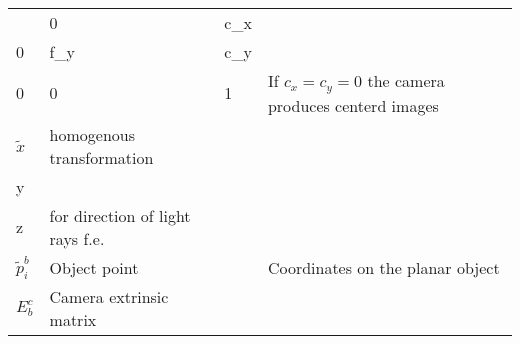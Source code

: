 \documentclass[
]{article}
\newcommand{\columnA}{0.06}
\newcommand{\columnB}{0.18}
\newcommand{\columnC}{0.33}
\newcommand{\columnD}{0.33}
\begin{document}
\begin{longtable}[]{@{}llll@{}}
\begin{minipage}[t]{\columnC\columnwidth}
\(K_c = \begin{bmatrix} f_x & 0 & c_x \\ 0 & f_y & c_y \\ 0 & 0 & 1 \end{bmatrix}\)\strut
\end{minipage} & \begin{minipage}[t]{\columnD\columnwidth}\raggedright
If \(c_x=c_y=0\) the camera produces centerd images\strut
\end{minipage}\hline\tabularnewline
\begin{minipage}[t]{\columnA\columnwidth}\raggedright
\(\tilde{x}\)\strut
\end{minipage} & \begin{minipage}[t]{\columnB\columnwidth}\raggedright
homogenous transformation\strut
\end{minipage} & \begin{minipage}[t]{\columnC\columnwidth}\raggedright
\(\tilde{x}= K_c*\begin{bmatrix} x\\y\\z \end{bmatrix}\)\strut
\end{minipage} & \begin{minipage}[t]{\columnD\columnwidth}\raggedright
for direction of light rays f.e.\strut
\end{minipage}\hline\tabularnewline
\begin{minipage}[t]{\columnA\columnwidth}\raggedright
\(\tilde{p}_i^b\)\strut
\end{minipage} & \begin{minipage}[t]{\columnB\columnwidth}\raggedright
Object point\strut
\end{minipage} & \begin{minipage}[t]{\columnC\columnwidth}\raggedright
\strut
\end{minipage} & \begin{minipage}[t]{\columnD\columnwidth}\raggedright
Coordinates on the planar object\strut
\end{minipage}\hline\tabularnewline
\begin{minipage}[t]{\columnA\columnwidth}\raggedright
\(E_b^c\)\strut
\end{minipage} & \begin{minipage}[t]{\columnB\columnwidth}\raggedright
Camera extrinsic matrix\strut
\end{minipage} & \begin{minipage}[t]{\columnC\columnwidth}\raggedright

\end{minipage}
\end{longtable}
\end{document}

